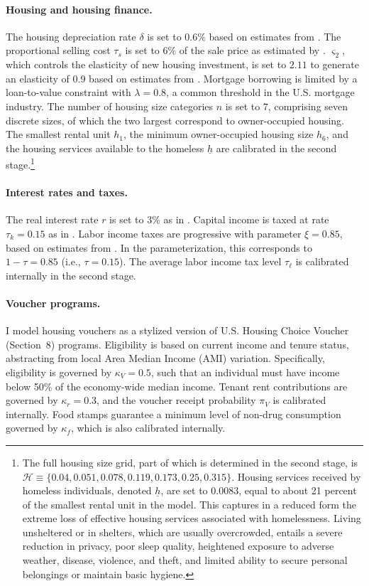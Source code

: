 \documentclass[parskip=full]{article}
\theoremstyle{plain}
\theoremstyle{definition}
\theoremstyle{remark}
\begin{document}
\paragraph{Housing and housing finance.} The housing depreciation rate $\delta$ is set to $0.6\%$ based on estimates from \citet{rosenthal-2014}. The proportional selling cost $\tau_s$ is set to $6\%$ of the sale price as estimated by \citet{gm-2003}. $\varsigma_2$, which controls the elasticity of new housing investment, is set to $2.11$ to generate an elasticity of 0.9 based on estimates from \citet{sommersullivan-2017}. Mortgage borrowing is limited by a loan-to-value constraint with $\lambda=0.8$, a common threshold in the U.S. mortgage industry. The number of housing size categories $n$ is set to $7$, comprising seven discrete sizes, of which the two largest correspond to owner-occupied housing. The smallest rental unit $h_{1}$, the minimum owner-occupied housing size $h_{6}$, and the housing services available to the homeless $\underline{h}$ are calibrated in the second stage.\footnote{The full housing size grid, part of which is determined in the second stage, is $\mathcal{H}\equiv \{0.04, 0.051, 0.078, 0.119, 0.173, 0.25, 0.315\}$. Housing services received by homeless individuals, denoted $\underline{h}$, are set to $0.0083$, equal to about 21 percent of the smallest rental unit in the model. This captures in a reduced form the extreme loss of effective housing services associated with homelessness. Living unsheltered or in shelters, which are usually overcrowded, entails a severe reduction in privacy, poor sleep quality, heightened exposure to adverse weather, disease, violence, and theft, and limited ability to secure personal belongings or maintain basic hygiene.}

\paragraph{Interest rates and taxes.} The real interest rate $r$ is set to 3\% as in \citet{kaplanetal-2019}. Capital income is taxed at rate $\tau_k=0.15$ as in \citet{kkk-2021}. Labor income taxes are progressive with parameter $\xi=0.85$, based on estimates from \citet{hsv-2020}. In the \citet{hsv-2020} parameterization, this corresponds to $1-\tau=0.85$ (i.e., $\tau=0.15$). The average labor income tax level $\tau_\ell$ is calibrated internally in the second stage.

\paragraph{Voucher programs.} I model housing vouchers as a stylized version of U.S. Housing Choice Voucher (Section~8) programs. Eligibility is based on current income and tenure status, abstracting from local Area Median Income (AMI) variation. Specifically, eligibility is governed by $\kappa_V=0.5$, such that an individual must have income below 50\% of the economy-wide median income. Tenant rent contributions are governed by $\kappa_r=0.3$, and the voucher receipt probability $\pi_V$ is calibrated internally. Food stamps guarantee a minimum level of non-drug consumption governed by $\kappa_f$, which is also calibrated internally.
\end{document}
